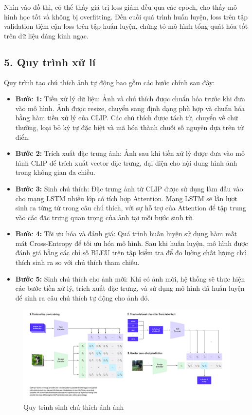 \documentclass[../main.tex]{subfiles}
\begin{document}
Nhìn vào đồ thị, có thể thấy giá trị loss giảm đều qua các epoch, cho thấy mô hình học tốt và không bị overfitting. Đến cuối quá trình huấn luyện, loss trên tập validation tiệm cận loss trên tập huấn luyện, chứng tỏ mô hình tổng quát hóa tốt trên dữ liệu đáng kinh ngạc.

\subsection*{5. Quy trình xử lí}

Quy trình tạo chú thích ảnh tự động bao gồm các bước chính sau đây:
\begin{itemize}
    \item \textbf{Bước 1: } Tiền xử lý dữ liệu: Ảnh và chú thích được chuẩn hóa trước khi đưa vào mô hình. Ảnh được resize, chuyển sang định dạng phù hợp và chuẩn hóa bằng hàm tiền xử lý của CLIP. Các chú thích được tách từ, chuyển về chữ thường, loại bỏ ký tự đặc biệt và mã hóa thành chuỗi số nguyên dựa trên từ điển.
    \item \textbf{Bước 2: } Trích xuất đặc trưng ảnh: Ảnh sau khi tiền xử lý được đưa vào mô hình CLIP để trích xuất vector đặc trưng, đại diện cho nội dung hình ảnh trong không gian đa chiều.
    \item \textbf{Bước 3: } Sinh chú thích: Đặc trưng ảnh từ CLIP được sử dụng làm đầu vào cho mạng LSTM nhiều lớp có tích hợp Attention. Mạng LSTM sẽ lần lượt sinh ra từng từ trong câu chú thích, với sự hỗ trợ của Attention để tập trung vào các đặc trưng quan trọng của ảnh tại mỗi bước sinh từ.
    \item \textbf{Bước 4: } Tối ưu hóa và đánh giá: Quá trình huấn luyện sử dụng hàm mất mát Cross-Entropy để tối ưu hóa mô hình. Sau khi huấn luyện, mô hình được đánh giá bằng các chỉ số BLEU trên tập kiểm tra để đo lường chất lượng chú thích sinh ra so với chú thích tham chiếu.
    \item \textbf{Bước 5: } Sinh chú thích cho ảnh mới: Khi có ảnh mới, hệ thống sẽ thực hiện các bước tiền xử lý, trích xuất đặc trưng, và sử dụng mô hình đã huấn luyện để sinh ra câu chú thích tự động cho ảnh đó.
\end{itemize}

\begin{figure}[H]
    \centering
    \includegraphics[width=1\textwidth]{Image/imagecaptioning.png}
    \caption{Quy trình sinh chú thích ảnh ảnh}
    \label{fig:loss}
\end{figure}
\end{document}
